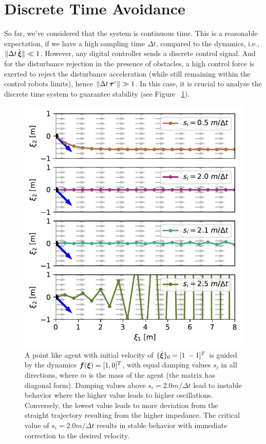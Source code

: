 \section{Discrete Time Avoidance}
So far, we've considered that the system is continuous time. 
This is a reasonable expectation, if we have a high sampling time $\Delta t$, compared to the dynamics, i.e., $\| \Delta t \, \dot{\boldsymbol{\xi}} \| \ll 1$.
However, any digital controller sends a discrete control signal. And for the disturbance rejection in the presence of obstacles, a high control force is exerted to reject the disturbance acceleration (while still remaining within the control robots limits), hence $\| \Delta t \, \boldsymbol{\tau}^c \| \gg 1$. 
In this case, it is crucial to analyse the discrete time system to guarantee stability (see Figure~
\ref{fig:discrete_controller_parameters_comparison}).

\begin{figure}[htb]
\centering
  \includegraphics[width=\columnwidth]{figures/discrete_controller_parameters_comparison}
  \caption{A point like agent with initial velocity of $\{ \dot{\boldsymbol{\xi}} \}_0 = [1 \; -1]^T$ is guided by the dynamics $\boldsymbol{f}(\boldsymbol{\xi}) = [1, 0]^T$, with equal damping values $s_i$ in all directions, where $m$ is the mass of the agent (the matrix has diagonal form). 
  Damping values above $s_i = 2.0 m / \Delta t$ lead to instable behavior where the higher value leads to higher oscillations. Conversely, the lowest value leads to more deviation from the straight trajectory resulting from the higher impedance. The critical value of $s_i = 2.0 m / \Delta t$ results in stable behavior with immediate correction to the desired velocity.}
  \label{fig:discrete_controller_parameters_comparison}
\end{figure}


